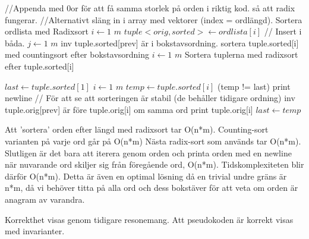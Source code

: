 \documentclass[11pt,a4paper,article,oneside]{memoir}
\begin{document}
 \begin {codebox}
 \zi //Appenda med 0or för att få samma storlek på orden i riktig kod. så att radix fungerar.
 \zi //Alternativt släng in i array med vektorer (index = ordlängd).
 \zi Sortera ordlista med Radixsort 
\zi \For $i \gets 1$ \To $m$
\zi \Do $ tuple<orig,sorted> \gets ordlista[i]$ // Insert i båda.
\End
\zi \For $j \gets 1$ \To $m$
\zi inv tuple.sorted[prev] är i bokstavsordning. 
\zi \Do sortera tuple.sorted[i] med countingsort efter bokstavsordning 
\End
\zi \For $i \gets 1$ \To $m$
\Indentmore
\zi Sortera tuplerna med radixsort efter tuple.sorted[i]
\End
\End
\End

\zi $last \gets tuple.sorted[1]$
\zi \For $i \gets 1$ \To $m$
\zi \Do $temp \gets tuple.sorted[i]$
\Indentmore
\Indentmore
\zi \If (temp != last)
\Indentmore
\zi  print newline
\End
\zi // För att se att sorteringen är stabil (de behåller tidigare ordning)
\zi inv tuple.orig[prev] är före tuple.orig[i] om samma ord
\zi  print tuple.orig[i]
\zi  $last \gets temp$
\End

 \end {codebox}

 Att 'sortera' orden efter längd med radixsort tar O(n*m). Counting-sort varianten på varje ord går på O(n*m) 
 Nästa radix-sort som används tar O(n*m). Slutligen är det bara att iterera genom orden och
 printa orden med en newline när nuvarande ord skiljer sig från föregående ord, O(n*m). Tidskomplexiteten blir därför O(n*m). 
 Detta är även en optimal lösning då en trivial undre gräns är n*m, då vi behöver titta på alla ord och dess bokstäver 
  för att veta om orden är anagram av varandra.

Korrekthet visas genom tidigare resonemang. Att pseudokoden är korrekt visas med invarianter. 
\end{document}

